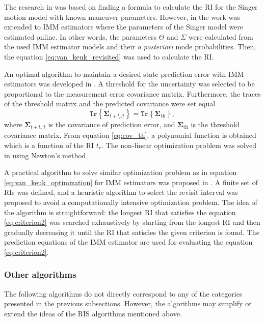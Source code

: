 \documentclass[english, 12pt, a4paper, elec, utf8, a-1b, online]{aaltothesis}
\numberwithin{equation}{section}
\renewcommand{\vec}[1]{\mathbf{#1}}
\newcommand{\tr}[1]{\texttt{Tr}\left\{ #1 \right\}}
\def\post{\textit{a posteriori}}
\newcommand{\ri}{t_r}
\begin{document}
The research in \cite{Keuk1975, vanKeuk1993} was based on finding a formula to calculate the RI for the Singer motion model with known maneuver parameters.
However, in \cite{Shin1995} the work was extended to IMM estimators where the parameters of the Singer model were estimated online.
In other words, the parameters $\Theta$ and $\Sigma$ were calculated from the used IMM estimator models and their \post{} mode probabilities.
Then, the equation \eqref{eq:van_keuk_revisited} was used to calculate the RI.

An optimal algorithm to maintain a desired state prediction error with IMM estimators was developed in \cite{Watson1993}.
A threshold for the uncertainty was selected to be proportional to the measurement error covariance matrix.
Furthermore, the traces of the threshold matrix and the predicted covariance were set equal
\begin{equation}\label{eq:cov_th}
    \tr{ \vec{\Sigma}_{t+\ri|t} } = \tr{ \vec{\Sigma}_{\text{th}} },
\end{equation}
where $\vec{\Sigma}_{t+\ri|t}$ is the covariance of prediction error, and $\vec{\Sigma}_{\text{th}}$ is the threshold covariance matrix.
From equation \eqref{eq:cov_th}, a polynomial function is obtained which is a function of the RI $\ri$.
The non-linear optimization problem was solved in \cite{Watson1993} using Newton's method.

A practical algorithm to solve similar optimization problem as in equation \eqref{eq:van_keuk_optimization} for IMM estimators was proposed in \cite{Daeipour1994}. A finite set of RIs was defined, and a heuristic algorithm to select the revisit interval was proposed to avoid a computationally intensive optimization problem.
The idea of the algorithm is straightforward: the longest RI that satisfies the equation \eqref{eq:criterion2} was searched exhaustively by starting from the longest RI and then gradually decreasing it until the RI that satisfies the given criterion is found. 
The prediction equations of the IMM estimator are used for evaluating the equation \eqref{eq:criterion2}.

\subsubsection{Other algorithms}

The following algorithms do not directly correspond to any of the categories presented in the previous subsections.
However, the algorithms may simplify or extend the ideas of the RIS algorithms mentioned above.
\end{document}
